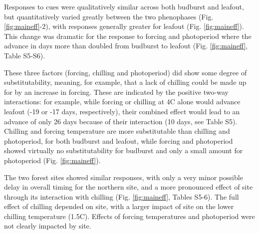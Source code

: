\documentclass[11pt]{article}
\begin{document}
Responses to cues were qualitatively similar across both budburst and leafout, but quantitatively varied greatly between the two phenophases (Fig. \ref{fig:maineff}-2), with responses generally greater for leafout (Fig. \ref{fig:maineff}). This change was dramatic for the response to forcing and photoperiod where the advance in days more than doubled from budburst to leafout (Fig. \ref{fig:maineff}, Table S5-S6).

These three factors (forcing, chilling and photoperiod) did show some degree of substitutability, meaning, for example, that a lack of chilling could be made up for by an increase in forcing. These are indicated by the positive two-way interactions: for example, while forcing or chilling at 4\degree C alone would advance leafout (-19 or -17 days, respectively), their combined effect would lead to an advance of only 26 days because of their interaction (10 days, see Table S5). Chilling and forcing temperature are more substitutable than chilling and photoperiod, for both budburst and leafout, while forcing and photoperiod showed virtually no substitutability for budburst and only a small amount for photoperiod (Fig. \ref{fig:maineff}).

The two forest sites showed similar responses, with only a very minor possible delay in overall timing for the northern site, and a more pronounced effect of site through its interaction with chilling (Fig. \ref{fig:maineff}, Tables S5-6). The full effect of chilling depended on site, with a larger impact of site on the lower chilling temperature (1.5\degree C). Effects of forcing temperatures and photoperiod were not clearly impacted by site. 
\end{document}
